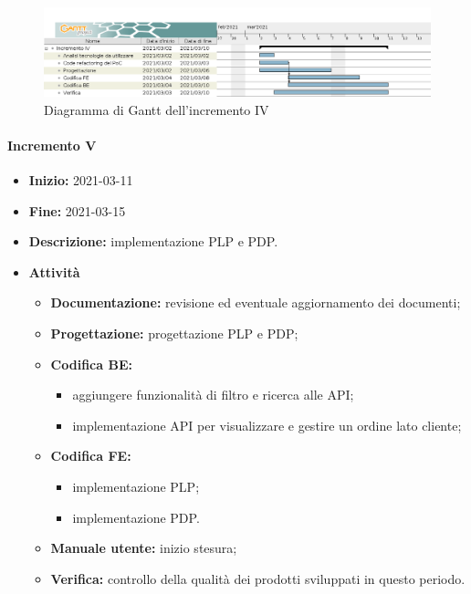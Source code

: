 \begin{figure}[H]
    \centering
    \includegraphics[width=1\linewidth]{res/images/pianificazione/incremento_4.png}
    \caption{Diagramma di Gantt dell'incremento IV}
    \label{fig:_Gantt incremento IV}
\end{figure}

\paragraph[Incremento V]{Incremento V}
\begin{itemize}
    \item [] \textbf{Inizio:} 2021-03-11
    \item [] \textbf{Fine:} 2021-03-15
    \item [] \textbf{Descrizione:} implementazione PLP e PDP.
    \item [] \textbf{Attività}
          \begin{itemize}
              \item \textbf{Documentazione:} revisione ed eventuale aggiornamento dei documenti;
              \item \textbf{Progettazione:} progettazione PLP e PDP;
              \item \textbf{Codifica BE:}
                    \begin{itemize}
                        \item aggiungere funzionalità di filtro e ricerca alle API;
                        \item implementazione API per visualizzare e gestire un ordine lato cliente;
                    \end{itemize}
              \item \textbf{Codifica FE:}
                    \begin{itemize}
                        \item implementazione PLP;
                        \item implementazione PDP.
                    \end{itemize}
              \item \textbf{Manuale utente:} inizio stesura;
              \item \textbf{Verifica:} controllo della qualità dei prodotti sviluppati in questo periodo.
          \end{itemize}
\end{itemize}

